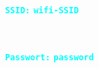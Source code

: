 \documentclass[a4paper]{scrartcl}
\begin{document}
\thispagestyle{empty}

\begin{center}
  {\textcolor{cyan}{\fontsize{50}{84}\texttt{\textbf{ SSID:}} \fontsize{80}{84}\texttt{\textbf{wifi-SSID}}}}\\[1cm]  %
  \item \textcolor{Cerulean}{}\\[20mm]
  \item \textcolor{cyan}{\fontsize{50}{84}\texttt{\textbf{ Passwort:}} \fontsize{110}{84}\texttt{\textbf{password}}}\\[2cm]
\end{center}
\end{document}
